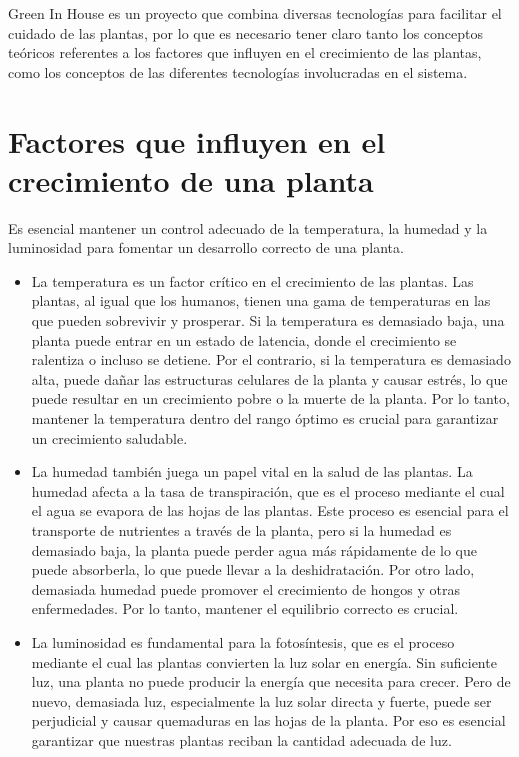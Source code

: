 
Green In House es un proyecto que combina diversas tecnologías para facilitar el cuidado de las plantas, por lo que es necesario tener claro tanto los conceptos teóricos referentes a los factores que influyen en el crecimiento de las plantas, como los conceptos de las diferentes tecnologías involucradas en el sistema.

\section{Factores que influyen en el crecimiento de una planta}

Es esencial mantener un control adecuado de la temperatura, la humedad y la luminosidad para fomentar un desarrollo correcto de una planta.

\begin{itemize}

    \item La temperatura es un factor crítico en el crecimiento de las plantas. Las plantas, al igual que los humanos, tienen una gama de temperaturas en las que pueden sobrevivir y prosperar. Si la temperatura es demasiado baja, una planta puede entrar en un estado de latencia, donde el crecimiento se ralentiza o incluso se detiene. Por el contrario, si la temperatura es demasiado alta, puede dañar las estructuras celulares de la planta y causar estrés, lo que puede resultar en un crecimiento pobre o la muerte de la planta. Por lo tanto, mantener la temperatura dentro del rango óptimo es crucial para garantizar un crecimiento saludable.
    
    \item La humedad también juega un papel vital en la salud de las plantas. La humedad afecta a la tasa de transpiración, que es el proceso mediante el cual el agua se evapora de las hojas de las plantas. Este proceso es esencial para el transporte de nutrientes a través de la planta, pero si la humedad es demasiado baja, la planta puede perder agua más rápidamente de lo que puede absorberla, lo que puede llevar a la deshidratación. Por otro lado, demasiada humedad puede promover el crecimiento de hongos y otras enfermedades. Por lo tanto, mantener el equilibrio correcto es crucial.
    
    \item La luminosidad es fundamental para la fotosíntesis, que es el proceso mediante el cual las plantas convierten la luz solar en energía. Sin suficiente luz, una planta no puede producir la energía que necesita para crecer. Pero de nuevo, demasiada luz, especialmente la luz solar directa y fuerte, puede ser perjudicial y causar quemaduras en las hojas de la planta. Por eso es esencial garantizar que nuestras plantas reciban la cantidad adecuada de luz.

\end{itemize}

